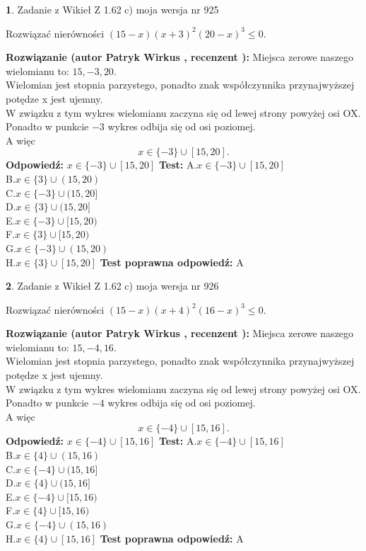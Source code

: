 \documentclass[12pt, a4paper]{article}
\theoremstyle{definition} %
\newtheorem{zad}{}
\newcommand{\zadStart}[1]{\begin{zad}#1\newline}
\newcommand{\zadStop}{\end{zad}}
\newcommand{\rozwStart}[2]{\noindent \textbf{Rozwiązanie (autor #1 , recenzent #2): }\newline}
\newcommand{\rozwStop}{\newline}
\newcommand{\odpStart}{\noindent \textbf{Odpowiedź:}\newline}
\newcommand{\odpStop}{\newline}
\newcommand{\testStart}{\noindent \textbf{Test:}\newline}
\newcommand{\testStop}{\newline}
\newcommand{\kluczStart}{\noindent \textbf{Test poprawna odpowiedź:}\newline}
\newcommand{\kluczStop}{\newline}
\begin{document}
\zadStart{Zadanie z Wikieł Z 1.62 c) moja wersja nr 925}

Rozwiązać nierówności $(15-x)(x+3)^{2}(20-x)^{3}\le0$.
\zadStop
\rozwStart{Patryk Wirkus}{}
Miejsca zerowe naszego wielomianu to: $15, -3, 20$.\\
Wielomian jest stopnia parzystego, ponadto znak współczynnika przy\linebreak najwyższej potędze x jest ujemny.\\ W związku z tym wykres wielomianu zaczyna się od lewej strony powyżej osi OX.\\
Ponadto w punkcie $-3$ wykres odbija się od osi poziomej.\\
A więc $$x \in \{-3\} \cup [15,20].$$
\rozwStop
\odpStart
$x \in \{-3\} \cup [15,20]$
\odpStop
\testStart
A.$x \in \{-3\} \cup [15,20]$\\
B.$x \in \{3\} \cup (15,20)$\\
C.$x \in \{-3\} \cup (15,20]$\\
D.$x \in \{3\} \cup (15,20]$\\
E.$x \in \{-3\} \cup [15,20)$\\
F.$x \in \{3\} \cup [15,20)$\\
G.$x \in \{-3\} \cup (15,20)$\\
H.$x \in \{3\} \cup [15,20]$
\testStop
\kluczStart
A
\kluczStop



\zadStart{Zadanie z Wikieł Z 1.62 c) moja wersja nr 926}

Rozwiązać nierówności $(15-x)(x+4)^{2}(16-x)^{3}\le0$.
\zadStop
\rozwStart{Patryk Wirkus}{}
Miejsca zerowe naszego wielomianu to: $15, -4, 16$.\\
Wielomian jest stopnia parzystego, ponadto znak współczynnika przy\linebreak najwyższej potędze x jest ujemny.\\ W związku z tym wykres wielomianu zaczyna się od lewej strony powyżej osi OX.\\
Ponadto w punkcie $-4$ wykres odbija się od osi poziomej.\\
A więc $$x \in \{-4\} \cup [15,16].$$
\rozwStop
\odpStart
$x \in \{-4\} \cup [15,16]$
\odpStop
\testStart
A.$x \in \{-4\} \cup [15,16]$\\
B.$x \in \{4\} \cup (15,16)$\\
C.$x \in \{-4\} \cup (15,16]$\\
D.$x \in \{4\} \cup (15,16]$\\
E.$x \in \{-4\} \cup [15,16)$\\
F.$x \in \{4\} \cup [15,16)$\\
G.$x \in \{-4\} \cup (15,16)$\\
H.$x \in \{4\} \cup [15,16]$
\testStop
\kluczStart
A
\kluczStop
\end{document}
